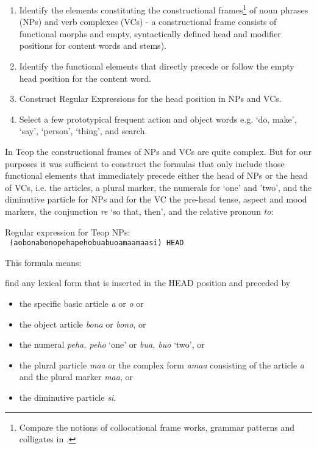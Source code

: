 \begin{enumerate}
\item {Identify the elements constituting the constructional frames\footnote{Compare 
 the notions of collocational frame works, grammar patterns and colligates in \citet[936-937]{StefanowitschEtAl2009}. 
} 
of noun phrases (NPs) and verb complexes (VCs) - a constructional frame consists of functional morphs and empty, syntactically defined head and modifier positions for content words and stems).}
\item {Identify the functional elements that directly precede or follow the empty head position for the content word.}
\item {Construct Regular Expressions for the head position in NPs and VCs.}
\item {Select a few prototypical frequent action and object words e.g. `do, make', `say', `person', `thing', and search.}
\end{enumerate}

In Teop the constructional frames of NPs and VCs are quite complex. But for our purposes it was sufficient to construct the formulas that only include those functional elements that immediately precede either the head of NPs or the head of VCs, i.e. the articles, a plural marker, the numerals for `one' and 'two', and the diminutive particle for NPs and for the VC the pre-head tense, aspect and mood markers, the conjunction \textit{re} `so that, then', and the relative pronoun \textit{to}:
 
\ea \label{ex:m2} Regular expression for Teop NPs: \\
\texttt{
{\regexB}(a{\textbar}o{\textbar}bona{\textbar}bono{\textbar}peha{\textbar}peho{\textbar}bua{\textbar}buo{\textbar}amaa{\textbar}maa{\textbar}si){\regexB}
\newline
{\regexB}HEAD{\regexB}
}
\z



This formula means:
 
\ea \label{ex:m3} find any lexical form that is inserted in the HEAD position and preceded by 

\begin{itemize}
\item {the specific basic article \textit{a} or \textit{o} or }
\item {the object article \textit{bona }or \textit{bono}, or}
\item {the numeral \textit{peha, peho} `one' or \textit{bua, buo} `two',   or}
\item {the plural particle \textit{maa} or the complex form \textit{amaa} consisting of the article \textit{a} and the plural marker \textit{maa}, or}
\item {the diminutive particle \textit{si}. }
\end{itemize}
\z

